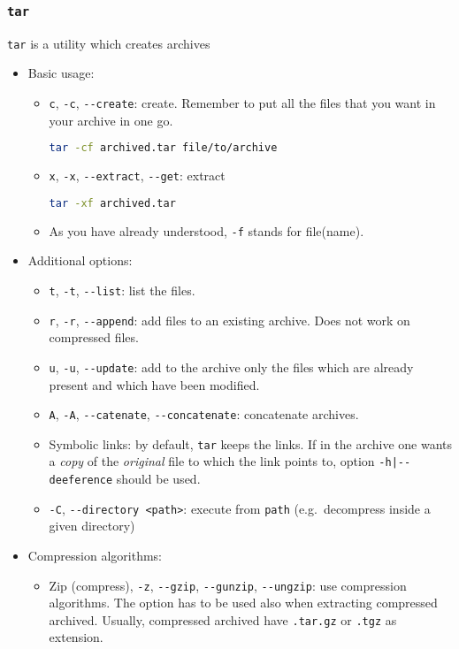 \documentclass[a4paper,12pt,%
              final%
              ]{article}
\begin{document}
\subsubsection{\texttt{tar}}
\texttt{tar} is a utility which creates archives
\begin{itemize}
  \item Basic usage:
    \begin{itemize}
      \item \verb|c|, \verb|-c|, \verb|--create|: create. Remember to put all the files that you want in your archive in one go.
\begin{lstlisting}[language=bash]
tar -cf archived.tar file/to/archive
\end{lstlisting}
      \item \verb|x|, \verb|-x|, \verb|--extract|, \verb|--get|: extract
\begin{lstlisting}[language=bash]
tar -xf archived.tar
\end{lstlisting}
      \item As you have already understood, \verb|-f| stands for file(name).
    \end{itemize}
  \item Additional options:
    \begin{itemize}
      \item \verb|t|, \verb|-t|, \verb|--list|: list the files.
      \item \verb|r|, \verb|-r|, \verb|--append|: add files to an existing archive. Does not work on compressed files.
      \item \verb|u|, \verb|-u|, \verb|--update|: add to the archive only the files which are already present and which have been modified.
      \item \verb|A|, \verb|-A|, \verb|--catenate|, \verb|--concatenate|: concatenate archives.
      \item Symbolic links: by default, \texttt{tar} keeps the links. If in the archive one wants a \emph{copy} of the \emph{original} file to which the link points to, option \verb!-h|--deeference! should be used.
      \item \verb|-C|, \verb|--directory <path>|: execute from \verb|path| (e.g.\ decompress inside a given directory)
    \end{itemize}
  \item Compression algorithms:
    \begin{itemize}
      \item Zip (compress), \verb|-z|, \verb|--gzip|, \verb|--gunzip|, \verb|--ungzip|: use compression algorithms. The option has to be used also when extracting compressed archived. Usually, compressed archived have \verb|.tar.gz| or \verb|.tgz| as extension.

\end{itemize}
\end{itemize}
\end{document}
